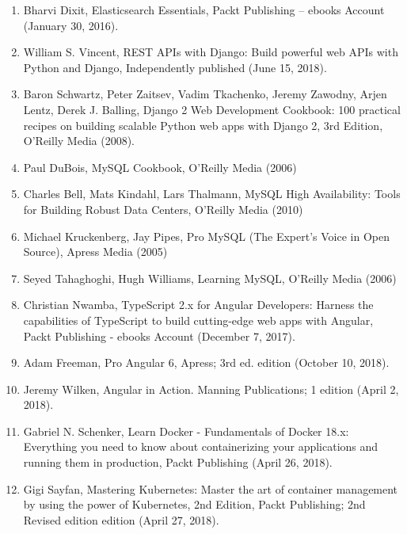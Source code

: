\begin{enumerate}[wide,topsep=0pt]
\item
Bharvi Dixit,
Elasticsearch Essentials,
Packt Publishing – ebooks Account (January 30, 2016).

\item
William S. Vincent,
REST APIs with Django: Build powerful web APIs with Python and Django,
Independently published (June 15, 2018).

\item
Baron Schwartz, Peter Zaitsev, Vadim Tkachenko, Jeremy Zawodny, Arjen Lentz, Derek J. Balling,
Django 2 Web Development Cookbook: 100 practical recipes on building scalable Python web apps with Django 2, 3rd Edition,
O'Reilly Media (2008).

\item
Paul DuBois,
MySQL Cookbook,
O'Reilly Media (2006)

\item
Charles Bell, Mats Kindahl, Lars Thalmann,
MySQL High Availability: Tools for Building Robust Data Centers,
O'Reilly Media (2010)

\item
Michael Kruckenberg, Jay Pipes,
Pro MySQL (The Expert's Voice in Open Source),
Apress Media (2005)

\item
Seyed Tahaghoghi, Hugh Williams,
Learning MySQL,
O'Reilly Media (2006)

\item
Christian Nwamba,
TypeScript 2.x for Angular Developers: Harness the capabilities of TypeScript to build cutting-edge web apps with Angular,
Packt Publishing - ebooks Account (December 7, 2017).

\item
Adam Freeman,
Pro Angular 6,
Apress; 3rd ed. edition (October 10, 2018).

\item
Jeremy Wilken,
Angular in Action.
Manning Publications; 1 edition (April 2, 2018).

\item
Gabriel N. Schenker,
Learn Docker - Fundamentals of Docker 18.x:\\ Everything you need to know about containerizing your applications and running them in production,
Packt Publishing (April 26, 2018).

\item
Gigi Sayfan,
Mastering Kubernetes: Master the art of container management by using the power of Kubernetes, 2nd Edition,
Packt Publishing; 2nd Revised edition edition (April 27, 2018).


\end{enumerate}
